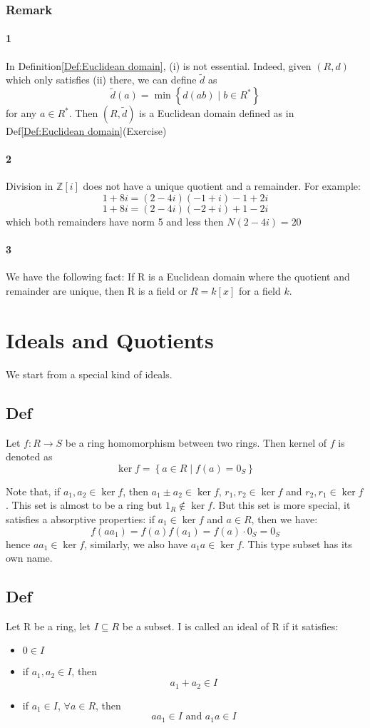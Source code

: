 \documentclass{book}
\newcommand{\set}[1]{\left\{#1\right\}}
\begin{document}
\subsection*{Remark}
\subsubsection{1}
In Definition\ref{Def:Euclidean domain}, (i) is not essential. Indeed, given $(R,d)$ which only satisfies (ii) there, we can define $\tilde d$ as
$$\tilde d(a)=\min\set{d(ab)\mid b\in R^*}$$
for any $a\in R^*$. Then $(R,\tilde d)$ is a Euclidean domain defined as in Def\ref{Def:Euclidean domain}(Exercise)
\subsubsection{2}
Division in $\mathbb Z[i]$ does not have a unique quotient and a remainder. For example:
$$1+8i=(2-4i)(-1+i)-1+2i$$
$$1+8i=(2-4i)(-2+i)+1-2i$$
which both remainders have norm 5 and less then $N(2-4i)=20$
\subsubsection{3}
We have the following fact: If R is a Euclidean domain where the quotient and remainder are unique, then R is a field or $R=k[x]$ for a field $k$.
\chapter{Ideals and Quotients}
We start from a special kind of ideals.
\section{Def}
Let $f:R\to S$ be a ring homomorphism between two rings. Then kernel of $f$ is denoted as $$\ker f=\set{a\in R\mid f(a)=0_S}$$

Note that, if $a_1,a_2\in \ker f$, then $a_1\pm a_2\in \ker f$, $r_1,r_2\in \ker f$ and $r_2,r_1\in \ker f$. This set is almost to be a ring but $1_R\notin \ker f$. But this set is more special, it satisfies a absorptive properties: if $a_1\in \ker f$ and $a\in R$, then we have:
$$f(aa_1)=f(a)f(a_1)=f(a)\cdot0_S=0_S$$
hence $aa_1\in \ker f$, similarly, we also have $a_1a\in \ker f$. This type subset has its own name.
\section{Def}
Let R be a ring, let $I\subseteq R$ be a subset. I is called an ideal of R if it satisfies:
\begin{itemize}
	\item $0\in I$
	\item if $a_1,a_2\in I$, then $$a_1+a_2\in I$$
	\item if $a_1\in I$, $\forall a\in R$, then $$aa_1\in I\text{ and }a_1a\in I$$
\end{itemize}
\end{document}
